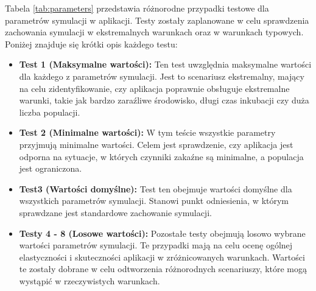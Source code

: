 Tabela \ref{tab:parameters} przedstawia różnorodne przypadki testowe dla parametrów symulacji w aplikacji. Testy zostały zaplanowane w celu sprawdzenia zachowania symulacji w ekstremalnych warunkach oraz w warunkach typowych. Poniżej znajduje się krótki opis każdego testu:

\begin{itemize}
	\item \textbf{Test 1 (Maksymalne wartości):} Ten test uwzględnia maksymalne wartości dla każdego z parametrów symulacji. Jest to scenariusz ekstremalny, mający na celu zidentyfikowanie, czy aplikacja poprawnie obsługuje ekstremalne warunki, takie jak bardzo zaraźliwe środowisko, długi czas inkubacji czy duża liczba populacji.

	\item \textbf{Test 2 (Minimalne wartości):} W tym teście wszystkie parametry przyjmują minimalne wartości. Celem jest sprawdzenie, czy aplikacja jest odporna na sytuacje, w których czynniki zakaźne są minimalne, a populacja jest ograniczona.
	
	\item \textbf{Test3 (Wartości domyślne):} Test ten obejmuje wartości domyślne dla wszystkich parametrów symulacji. Stanowi punkt odniesienia, w którym sprawdzane jest standardowe zachowanie symulacji.
	
	\item \textbf{Testy 4 - 8 (Losowe wartości):}
	 Pozostałe testy obejmują losowo wybrane wartości parametrów symulacji. Te przypadki mają na celu ocenę ogólnej elastyczności i skuteczności aplikacji w zróżnicowanych warunkach. Wartości te zostały dobrane w celu odtworzenia różnorodnych scenariuszy, które mogą wystąpić w rzeczywistych warunkach.
\end{itemize}
	
